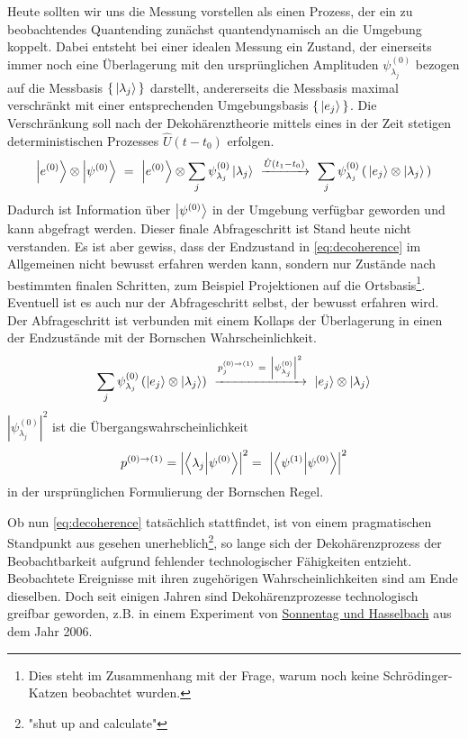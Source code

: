 \documentclass[12pt]{article}
\begin{document}
Heute sollten wir uns die Messung vorstellen als einen Prozess, der ein zu beobachtendes Quantending zunächst quantendynamisch an die Umgebung koppelt. 
Dabei entsteht bei einer idealen Messung ein Zustand, der einerseits immer noch eine Überlagerung mit den ursprünglichen Amplituden $\psi^{(0)}_{\lambda_j}$ bezogen auf die Messbasis $\{\,\ket{\lambda_j}\,\}$ darstellt, andererseits die Messbasis maximal verschränkt mit einer entsprechenden Umgebungsbasis $\{\,\ket{e_j}\,\}$. Die Verschränkung soll nach der Dekohärenztheorie mittels eines in der Zeit stetigen deterministischen Prozesses $\hat{U}(t-t_0)$ erfolgen.
\begin{equation}
\label{eq:decoherence}
\ket{e^{(0)}}\otimes\ket{\psi^{(0)}}\ =\ \ket{e^{(0)}}\otimes\sum_j \psi^{(0)}_{\lambda_j} \ket{\lambda_j}
\ \xrightarrow{\hat{U}(t_1-t_0)}\ \sum_j \psi^{(0)}_{\lambda_j} \left(\, \ket{e_j} \otimes \ket{\lambda_j}\, \right)
\end{equation}
Dadurch ist Information über $\ket{\psi^{(0)}}$ in der Umgebung verfügbar geworden und kann abgefragt werden. Dieser finale Abfrageschritt ist Stand heute nicht verstanden. Es ist aber gewiss, dass der Endzustand in \eqref{eq:decoherence} im Allgemeinen nicht bewusst erfahren werden kann, sondern nur Zustände nach bestimmten finalen Schritten, zum Beispiel Projektionen auf die Ortsbasis\footnote{Dies steht im Zusammenhang mit der Frage, warum noch keine Schrödinger-Katzen beobachtet wurden.}. Eventuell ist es auch nur der Abfrageschritt selbst, der bewusst erfahren wird. Der Abfrageschritt ist verbunden mit einem Kollaps der Überlagerung in einen der Endzustände mit der Bornschen Wahrscheinlichkeit.
\begin{equation} 
\label{eq:collapse}
\sum_j \psi^{(0)}_{\lambda_j} \left( \ket{e_j} \otimes \ket{\lambda_j} \right)
\ \xrightarrow{p_j^{(0)\rightarrow(1)}\ =\ \left|\psi^{(0)}_{\lambda_j}\right|^2}\ 
\ket{e_j} \otimes \ket{\lambda_j}
\end{equation}
$\left|\psi^{(0)}_{\lambda_j}\right|^2$ ist die Übergangswahrscheinlichkeit 
\begin{equation} 
\label{eq:orig_Born}
p^{(0)\rightarrow(1)} 
= \Bigl| \bra{\lambda_j}\ket{\psi^{(0)}} \Bigr| ^2
=\ \Bigl| \bra{\psi^{(1)}}\ket{\psi^{(0)}} \Bigr| ^2
\end{equation}
in der ursprünglichen Formulierung der Bornschen Regel.

Ob nun \eqref{eq:decoherence} tatsächlich stattfindet, ist von einem pragmatischen Standpunkt aus gesehen unerheblich\footnote{"shut up and calculate"}, so lange sich der Dekohärenzprozess der Beobachtbarkeit aufgrund fehlender technologischer Fähigkeiten entzieht. Beobachtete Ereignisse mit ihren zugehörigen Wahrscheinlichkeiten sind am Ende dieselben. Doch seit einigen Jahren sind Dekohärenzprozesse technologisch greifbar geworden, z.B. in einem Experiment von \href{https://journals.aps.org/prl/abstract/10.1103/PhysRevLett.98.200402}{Sonnentag und Hasselbach} aus dem Jahr 2006.
\end{document}
